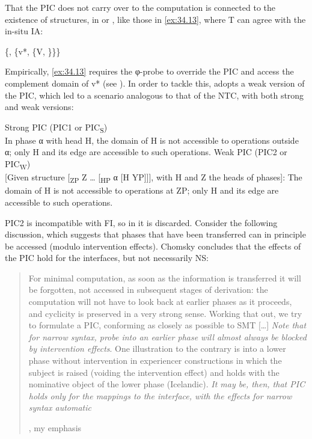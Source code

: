 \documentclass[output=paper]{langsci/langscibook}
\begin{document}
That the \gls{PIC} does not carry over to the computation is connected to the
existence of structures, in  or , like those in \eqref{ex:34.13}, where T
can agree with the in-situ \gls{IA}:

\ea\label{ex:34.13}
    \{, \{v*, \{V, \}\}\}
    \vspace{1.5\baselineskip}
\z

Empirically, \eqref{ex:34.13} requires the φ-probe to override the \gls{PIC} and access the
complement domain of v* (see \citealt{Richards2012}). In order to tackle this,
\textcite{Chomsky2001,Chomsky2004} adopts a weak version of the \gls{PIC}, which led to a
scenario analogous to that of the \gls{NTC}, with both strong and weak
versions:

\ea%
	\ea\label{ex:34.14a}Strong \gls{PIC} (PIC1 or PIC\textsubscript{S})\\
        In phase α with head H, the domain of H is not accessible to operations
        outside α; only H and its edge are accessible to such operations.
        \parencite[108]{Chomsky2000}
	\ex\label{ex:34.14b}Weak \gls{PIC} (PIC2 or PIC\textsubscript{W})\\
        {}[Given structure [\textsubscript{ZP} Z \dots{} [\textsubscript{HP} α
        [H YP]]], with H and Z the heads of phases]: The domain of H is not
        accessible to operations at ZP; only H and its edge are accessible to
        such operations. \parencite[14]{Chomsky2001}
	\z
\z

PIC2 is incompatible with \gls{FI}, so in \citet{Chomsky2008} it is discarded.
Consider the following discussion, which suggests that phases that have been
transferred can in principle be accessed (modulo intervention effects). Chomsky
concludes that the effects of the \gls{PIC} hold for the interfaces, but not
necessarily \gls{NS}:

\blockquote[{\citealt[143]{Chomsky2008}, my emphasis}][.]{For minimal
    computation, as soon as the information is transferred it will be
    forgotten, not accessed in subsequent stages of derivation: the computation
    will not have to look back at earlier phases as it proceeds, and cyclicity
    is preserved in a very strong sense. Working that out, we try to formulate
    a \gls{PIC}, conforming as closely as possible to \gls{SMT} [\dots{}]
    \emph{Note that for narrow syntax, probe into an earlier phase will
    almost always be blocked by intervention effects}. One illustration to the
    contrary is  into a lower phase without intervention in
    experiencer constructions in which the subject is raised (voiding the
    intervention effect) and  holds with the nominative object of the
    lower phase (Icelandic). \emph{It may be, then, that \gls{PIC} holds only
        for the mappings to the interface, with the effects for narrow syntax
automatic}}
\end{document}
